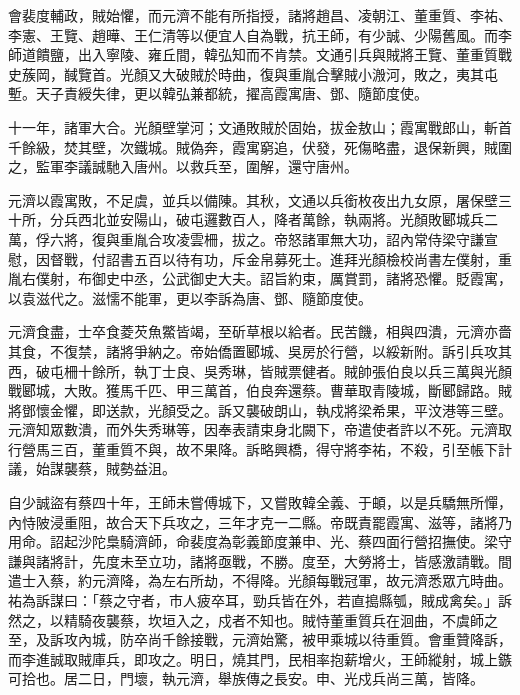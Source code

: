 \begin{pinyinscope}
 會裴度輔政，賊始懼，而元濟不能有所指授，諸將趙昌、凌朝江、董重質、李祐、李憲、王覽、趙曄、王仁清等以便宜人自為戰，抗王師，有少誠、少陽舊風。而李師道饋鹽，出入寧陵、雍丘間，韓弘知而不肯禁。文通引兵與賊將王覽、董重質戰史蔟岡，馘覽首。光顏又大破賊於時曲，復與重胤合擊賊小溵河，敗之，夷其屯塹。天子責綬失律，更以韓弘兼都統，擢高霞寓唐、鄧、隨節度使。



 十一年，諸軍大合。光顏壁掌河；文通敗賊於固始，拔金敖山；霞寓戰郎山，斬首千餘級，焚其壁，次鐵城。賊偽奔，霞寓窮追，伏發，死傷略盡，退保新興，賊圍之，監軍李議誠馳入唐州。以救兵至，圍解，還守唐州。



 元濟以霞寓敗，不足虞，並兵以備陳。其秋，文通以兵銜枚夜出九女原，屠保壁三十所，分兵西北並安陽山，破屯邏數百人，降者萬餘，執兩將。光顏敗郾城兵二萬，俘六將，復與重胤合攻凌雲柵，拔之。帝怒諸軍無大功，詔內常侍梁守謙宣慰，因督戰，付詔書五百以待有功，斥金帛募死士。進拜光顏檢校尚書左僕射，重胤右僕射，布御史中丞，公武御史大夫。詔旨約束，厲賞罰，諸將恐懼。貶霞寓，以袁滋代之。滋懦不能軍，更以李訴為唐、鄧、隨節度使。



 元濟食盡，士卒食菱芡魚鱉皆竭，至斫草根以給者。民苦饑，相與四潰，元濟亦嗇其食，不復禁，諸將爭納之。帝始僑置郾城、吳房於行營，以綏新附。訴引兵攻其西，破屯柵十餘所，執丁士良、吳秀琳，皆賊票健者。賊帥張伯良以兵三萬與光顏戰郾城，大敗。獲馬千匹、甲三萬首，伯良奔還蔡。曹華取青陵城，斷郾歸路。賊將鄧懷金懼，即送款，光顏受之。訴又襲破朗山，執戍將梁希果，平汶港等三壁。元濟知眾數潰，而外失秀琳等，因奉表請束身北闕下，帝遣使者許以不死。元濟取行營馬三百，董重質不與，故不果降。訴略興橋，得守將李祐，不殺，引至帳下計議，始謀襲蔡，賊勢益沮。



 自少誠盜有蔡四十年，王師未嘗傅城下，又嘗敗韓全義、于頔，以是兵驕無所憚，內恃陂浸重阻，故合天下兵攻之，三年才克一二縣。帝既責罷霞寓、滋等，諸將乃用命。詔起沙陀梟騎濟師，命裴度為彰義節度兼申、光、蔡四面行營招撫使。梁守謙與諸將計，先度未至立功，諸將亟戰，不勝。度至，大勞將士，皆感激請戰。間遣士入蔡，約元濟降，為左右所劫，不得降。光顏每戰冠軍，故元濟悉眾亢時曲。祐為訴謀曰：「蔡之守者，市人疲卒耳，勁兵皆在外，若直搗縣瓠，賊成禽矣。」訴然之，以精騎夜襲蔡，坎垣入之，戍者不知也。賊恃董重質兵在洄曲，不虞師之至，及訴攻內城，防卒尚千餘接戰，元濟始驚，被甲乘城以待重質。會重贊降訴，而李進誠取賊庫兵，即攻之。明日，燒其門，民相率抱薪增火，王師縱射，城上鏃可拾也。居二日，門壞，執元濟，舉族傳之長安。申、光戍兵尚三萬，皆降。




\end{pinyinscope}
